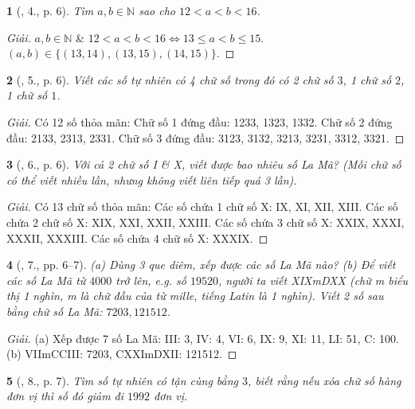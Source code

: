 \documentclass{article}
\newtheorem{baitoan}{}
\begin{document}
\begin{baitoan}[\cite{Binh_Toan_6_tap_1}, 4., p. 6]
	Tìm $a,b\in\mathbb{N}$ sao cho $12 < a < b < 16$.
\end{baitoan}

\begin{proof}[Giải]
	$a,b\in\mathbb{N}$ \& $12 < a < b < 16\Leftrightarrow13\le a < b\le15$. $(a,b)\in\{(13,14),(13,15),(14,15)\}$.
\end{proof}

\begin{baitoan}[\cite{Binh_Toan_6_tap_1}, 5., p. 6]
	Viết các số tự nhiên có 4 chữ số trong đó có 2 chữ số $3$, 1 chữ số $2$, 1 chữ số $1$.
\end{baitoan}

\begin{proof}[Giải]
	Có 12 số thỏa mãn: Chữ số 1 đứng đầu: 1233, 1323, 1332. Chữ số 2 đứng đầu: 2133, 2313, 2331. Chữ số 3 đứng đầu: 3123, 3132, 3213, 3231, 3312, 3321.
\end{proof}

\begin{baitoan}[\cite{Binh_Toan_6_tap_1}, 6., p. 6]
	Với cả 2 chữ số {\rm I} \& {\rm X}, viết được bao nhiêu số La Mã? (Mỗi chữ số có thể viết nhiều lần, nhưng không viết liên tiếp quá 3 lần).
\end{baitoan}

\begin{proof}[Giải]
	Có 13 chữ số thỏa mãn: Các số chứa 1 chữ số X: IX, XI, XII, XIII. Các số chứa 2 chữ số X: XIX, XXI, XXII, XXIII. Các số chứa 3 chữ số X: XXIX, XXXI, XXXII, XXXIII. Các số chứa 4 chữ số X: XXXIX.
\end{proof}

\begin{baitoan}[\cite{Binh_Toan_6_tap_1}, 7., pp. 6--7]
	(a) Dùng 3 que diêm, xếp được các số La Mã nào? (b) Để viết các số La Mã từ $4000$ trở lên, e.g. số $19520$, người ta viết {\rm XIXmDXX} (chữ {\rm m} biểu thị \emph{1 nghìn}, m là chữ đầu của từ \emph{mille}, tiếng Latin là 1 nghìn). Viết 2 số sau bằng chữ số La Mã: $7203, 121512$.
\end{baitoan}

\begin{proof}[Giải]
	(a) Xếp được 7 số La Mã: III: 3, IV: 4, VI: 6, IX: 9, XI: 11, LI: 51, C: 100. (b) VIImCCIII: 7203, CXXImDXII: 121512.
\end{proof}

\begin{baitoan}[\cite{Binh_Toan_6_tap_1}, 8., p. 7]
	Tìm số tự nhiên có tận cùng bằng $3$, biết rằng nếu xóa chữ số hàng đơn vị thì số đó giảm đi $1992$ đơn vị.
\end{baitoan}
\end{document}
